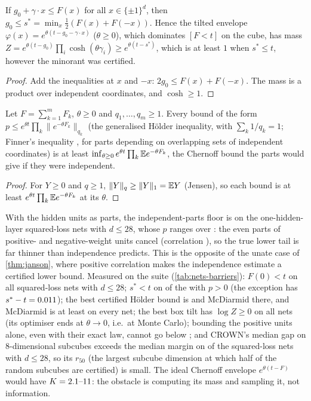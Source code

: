 \begin{proposition}\label{prop:cubebarrier}
If $g_0+\gamma\cdot x\le F(x)$ for all $x\in\{\pm1\}^d$, then
$g_0\le s^*=\min_x\frac12(F(x)+F(-x))$. Hence the tilted envelope
$\varphi(x)=e^{\theta(t-g_0-\gamma\cdot x)}$ ($\theta\ge0$), which dominates $[F<t]$ on the
cube, has mass $Z=e^{\theta(t-g_0)}\prod_i\cosh(\theta\gamma_i)\ge e^{\theta(t-s^*)}$,
which is at least $1$ when $s^*\le t$, however the minorant was certified.
\end{proposition}

\begin{proof}
Add the inequalities at $x$ and $-x$: $2g_0\le F(x)+F(-x)$. The mass is a product over
independent coordinates, and $\cosh\ge1$.
\end{proof}

\begin{proposition}\label{prop:decoupling}
Let $F=\sum_{k=1}^mF_k$, $\theta\ge0$ and $q_1,\dots,q_m\ge1$. Every bound of the form
$p\le e^{\theta t}\prod_k\|e^{-\theta F_k}\|_{q_k}$ (the generalised Hölder inequality,
with $\sum_k1/q_k=1$; Finner's inequality \cite{finner1992}, for parts depending on
overlapping sets of independent coordinates) is at least
$\inf_{\theta\ge0}e^{\theta t}\prod_k\mathbb{E} e^{-\theta F_k}$, the Chernoff bound the parts would
give if they were independent.
\end{proposition}

\begin{proof}
For $Y\ge0$ and $q\ge1$, $\|Y\|_q\ge\|Y\|_1=\mathbb{E} Y$ (Jensen), so each bound is at least
$e^{\theta t}\prod_k\mathbb{E} e^{-\theta F_k}$ at its $\theta$.
\end{proof}

With the hidden units as parts, the independent-parts floor is \nnFloorMse{} on the
one-hidden-layer squared-loss nets with $d\le28$, whose $p$ ranges over \nnPmse{}: the
even parts of positive- and negative-weight units cancel (correlation \nnCorrEvenPM{}),
so the true lower tail is far thinner than independence predicts. This is the
opposite of the unate case of \cref{thm:janson}, where positive correlation makes the
independence estimate a certified lower bound. Measured on the suite
(\cref{tab:nets-barriers}): $F(0)<t$ on all \nnMseSmallD{} squared-loss nets with
$d\le28$; $s^*<t$ on \nnSymNeg{} of the \nnMsePos{} with $p>0$ (the exception has
$s^*-t=0.011$); the best certified Hölder bound is \nnHolderMse{} and McDiarmid
\nnMcdMse{} there, and McDiarmid is at least \nnMcdAll{} on every net; the best box
tilt has $\log Z\ge0$ on all \nnTiltAll{} nets (its optimiser ends at $\theta\to0$, i.e.\
at Monte Carlo); bounding the positive units alone, even with their exact law, cannot
go below \nnQplus{}; and CROWN's median gap on $8$-dimensional subcubes exceeds the
median margin on \nnGapExceedsMse{} of the \nnMseSmallD{} squared-loss nets with
$d\le28$, so its $r_{50}$ (the largest subcube dimension at which half of the random
subcubes are certified) is small. The ideal Chernoff envelope $e^{\theta(t-F)}$ would have
$K=2.1\text{--}11{}$: the obstacle is computing its mass and sampling it, not information.

